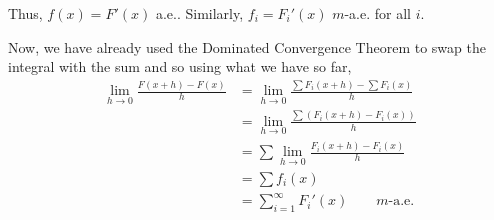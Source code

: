 \documentclass[12pt]{Qual}
\begin{document}
\begin{solution}
Thus, $f(x)=F'(x)$ a.e.. Similarly, $f_i=F_i'(x)$ $m$-a.e. for all $i.$

Now, we have already used the Dominated Convergence Theorem to swap the integral with the sum and so using what we have so far, \begin{align*}
    \lim_{h\to0}\frac{F(x+h)-F(x)}{h}&=\lim_{h\to0}\frac{\sum F_i(x+h)-\sum F_i(x)}{h}\\
    &=\lim_{h\to0}\frac{\sum(F_i(x+h)-F_i(x))}{h}\\
    &=\sum\lim_{h\to0}\frac{F_i(x+h)-F_i(x)}{h}\\
    &=\sum f_i(x)\\
    &=\sum_{i=1}^\infty F_i'(x)\qquad m\text{-a.e.}
\end{align*}
\end{solution}
\vspace{0.5cm}
\end{document}
